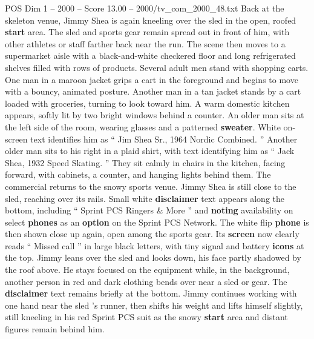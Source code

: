\begin{textsample}{POS Dim 1 – 2000 – Score 13.00 – 2000/tv\_com\_2000\_48.txt}
Back at the skeleton venue, Jimmy Shea is again kneeling over the sled in the open, roofed \textbf{start} area.
The sled and sports gear remain spread out in front of him, with other athletes or staff farther back near the run.
The scene then moves to a supermarket aisle with a black-and-white checkered floor and long refrigerated shelves filled with rows of products.
Several adult men stand with shopping carts.
One man in a maroon jacket grips a cart in the foreground and begins to move with a bouncy, animated posture.
Another man in a tan jacket stands by a cart loaded with groceries, turning to look toward him.
A warm domestic kitchen appears, softly lit by two bright windows behind a counter.
An older man sits at the left side of the room, wearing glasses and a patterned \textbf{sweater}.
White on-screen text identifies him as “ Jim Shea Sr., 1964 Nordic Combined. ” Another older man sits to his right in a plaid shirt, with text identifying him as “ Jack Shea, 1932 Speed Skating. ” They sit calmly in chairs in the kitchen, facing forward, with cabinets, a counter, and hanging lights behind them.
The commercial returns to the snowy sports venue.
Jimmy Shea is still close to the sled, reaching over its rails.
Small white \textbf{disclaimer} text appears along the bottom, including “ Sprint PCS Ringers \& More ” and \textbf{noting} availability on select \textbf{phones} as an \textbf{option} on the Sprint PCS Network.
The white flip \textbf{phone} is then shown close up again, open among the sports gear.
Its \textbf{screen} now clearly reads “ Missed call ” in large black letters, with tiny signal and battery \textbf{icons} at the top.
Jimmy leans over the sled and looks down, his face partly shadowed by the roof above.
He stays focused on the equipment while, in the background, another person in red and dark clothing bends over near a sled or gear.
The \textbf{disclaimer} text remains briefly at the bottom.
Jimmy continues working with one hand near the sled ’s runner, then shifts his weight and lifts himself slightly, still kneeling in his red Sprint PCS suit as the snowy \textbf{start} area and distant figures remain behind him.

\end{textsample}
